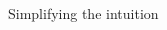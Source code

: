 \documentclass[notes,11pt, aspectratio=169]{beamer}
\begin{document}
\begin{frame}{Simplifying the intuition}
\begin{columns}[T]
\begin{column}{.7\textwidth}
  \end{column}
\end{columns}
\end{frame}
\end{document}
